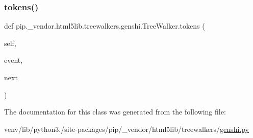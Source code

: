 \subsubsection{\texorpdfstring{tokens()}{tokens()}}
{\footnotesize\ttfamily def pip.\+\_\+vendor.\+html5lib.\+treewalkers.\+genshi.\+Tree\+Walker.\+tokens (\begin{DoxyParamCaption}\item[{}]{self,  }\item[{}]{event,  }\item[{}]{next }\end{DoxyParamCaption})}



The documentation for this class was generated from the following file\+:\begin{DoxyCompactItemize}
\item 
venv/lib/python3./site-\/packages/pip/\+\_\+vendor/html5lib/treewalkers/\hyperlink{treewalkers_2genshi_8py}{genshi.\+py}\end{DoxyCompactItemize}
